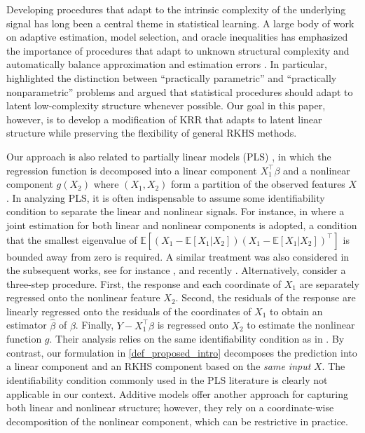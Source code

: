 \documentclass[11pt,twoside]{article}
\def\EE{\mathbb{E}}
\def\wh{\widehat}
\def\T{\top}
\begin{document}
Developing procedures that adapt to the intrinsic complexity of the underlying signal has long been a central theme in statistical learning. A large body of work on adaptive estimation, model selection, and oracle inequalities has emphasized the importance of procedures that adapt to unknown structural complexity and automatically balance approximation and estimation errors \citep{barron1999risk,birge2001gaussian,tsybakov2009introduction}. In particular, \citet{yang2011parametricness} highlighted the distinction between ``practically parametric'' and ``practically nonparametric'' problems and argued that statistical procedures should adapt to latent low-complexity structure whenever possible. Our goal in this paper, however, is to develop a modification of KRR that adapts to latent linear structure while preserving the flexibility of general RKHS methods.

Our approach is also related to partially linear models (PLS) \citep{HardleLiangGao2000}, in which the regression function is decomposed into a linear component $X_1^\T \beta$ and a nonlinear component $g(X_2)$ where $(X_1,X_2)$ form a partition of the observed features $X$. 
In analyzing PLS, it is often indispensable to assume some identifiability condition to separate the linear and nonlinear signals. For instance, in \cite{muller2015partial} where a joint estimation for both linear and nonlinear components is adopted, a condition that the smallest eigenvalue of  $\EE [ (X_1 -\EE[X_1| X_2])   (X_1 -\EE[X_1| X_2])^\T ] $ is bounded away from zero is required.
A similar treatment was also considered in the subsequent works, see for instance \cite{yu2019minimax}, and recently \cite{lee2024high}.  Alternatively, \cite{zhu2017nonasymptotic,zhu2019high} consider a three-step procedure. First, the response and each coordinate of $X_1$ are separately regressed onto the nonlinear feature $X_2$. Second, the residuals of the response are linearly regressed onto the residuals of the coordinates of $X_1$ to obtain an estimator $\wh \beta$ of $\beta$. Finally, $Y - X_1^\T \wh \beta$ is regressed onto $X_2$ to estimate the nonlinear function $g$.
Their analysis relies on the same identifiability condition
as in \cite{muller2015partial}.  
By contrast, our formulation in \eqref{def_proposed_intro} decomposes the prediction into a linear component and an RKHS component based on the {\em same input} $X$. The identifiability condition commonly used in the PLS literature is clearly not applicable in our context.  Additive models \citep{Wood2017} offer another approach for capturing both linear and nonlinear structure; however, they rely on a coordinate-wise decomposition of the nonlinear component, which can be restrictive in practice.\\
\end{document}
